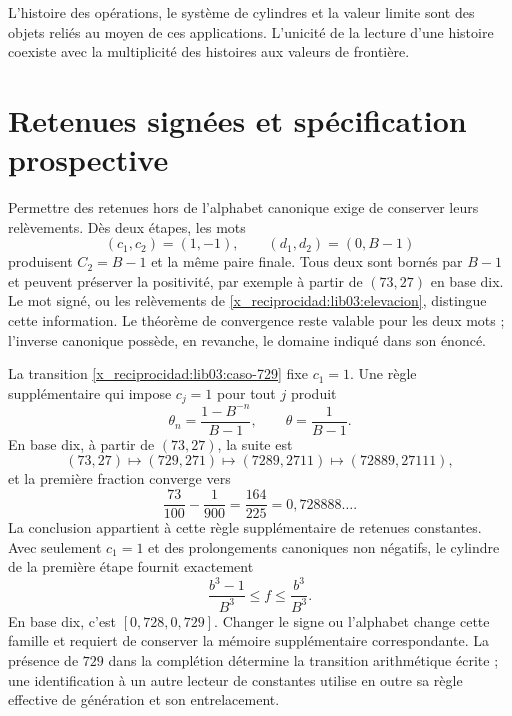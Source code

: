 L'histoire des opérations, le système de cylindres et la valeur limite sont des objets reliés au moyen de ces applications. L'unicité de la lecture d'une histoire coexiste avec la multiplicité des histoires aux valeurs de frontière.

\section{Retenues signées et spécification prospective}
\label{x_reciprocidad:lib03:firmados}

Permettre des retenues hors de l’alphabet canonique exige de conserver leurs
relèvements. Dès deux étapes, les mots
\[
 (c_1,c_2)=(1,-1),\qquad(d_1,d_2)=(0,B-1)
\]
produisent \(C_2=B-1\) et la même paire finale. Tous deux sont bornés par
\(B-1\) et peuvent préserver la positivité, par exemple à partir de
\((73,27)\) en base dix. Le mot signé, ou les relèvements de
\eqref{x_reciprocidad:lib03:elevacion}, distingue cette information. Le théorème de
convergence reste valable pour les deux mots ; l’inverse canonique
possède, en revanche, le domaine indiqué dans son énoncé.

La transition \eqref{x_reciprocidad:lib03:caso-729} fixe \(c_1=1\). Une règle supplémentaire qui impose \(c_j=1\) pour tout \(j\) produit
\begin{equation}
 \theta_n=\frac{1-B^{-n}}{B-1},\qquad
 \theta=\frac1{B-1}.
 \label{x_reciprocidad:lib03:acarreo-constante}
\end{equation}
En base dix, à partir de \((73,27)\), la suite est
\[
 (73,27)\longmapsto(729,271)\longmapsto(7289,2711)
 \longmapsto(72889,27111),
\]
et la première fraction converge vers
\begin{equation}
 \frac{73}{100}-\frac1{900}=\frac{164}{225}
 =0{,}728888\ldots.
 \label{x_reciprocidad:lib03:limite-constante}
\end{equation}
La conclusion appartient à cette règle supplémentaire de retenues constantes. Avec seulement \(c_1=1\) et des prolongements canoniques non négatifs, le cylindre de la première étape fournit exactement
\begin{equation}
 \frac{b^3-1}{B^3}\leq f\leq\frac{b^3}{B^3}.
 \label{x_reciprocidad:lib03:primer-cilindro}
\end{equation}
En base dix, c’est \([0{,}728,0{,}729]\). Changer le signe ou l’alphabet
change cette famille et requiert de conserver la mémoire supplémentaire
correspondante. La présence de \(729\) dans la complétion détermine
la transition arithmétique écrite ; une identification à un autre lecteur de
constantes utilise en outre sa règle effective de génération et son
entrelacement.

